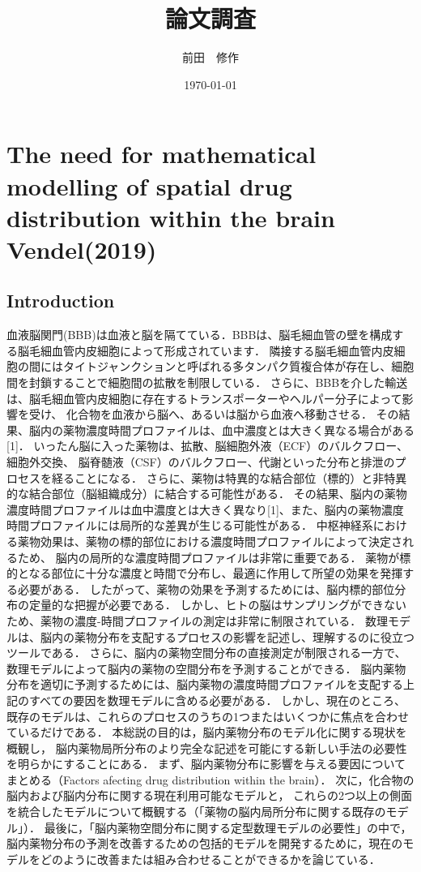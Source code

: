 \documentclass[11pt,a4paper]{jsarticle}
\title{論文調査}
\author{前田　修作}
\date{\today}
\begin{document}
\maketitle
%
%
\section{The need for mathematical modelling of spatial drug distribution within the brain Vendel(2019)}
\subsection{Introduction}
血液脳関門(BBB)は血液と脳を隔てている．BBBは、脳毛細血管の壁を構成する脳毛細血管内皮細胞によって形成されています．
隣接する脳毛細血管内皮細胞の間にはタイトジャンクションと呼ばれる多タンパク質複合体が存在し、細胞間を封鎖することで細胞間の拡散を制限している．
さらに、BBBを介した輸送は、脳毛細血管内皮細胞に存在するトランスポーターやヘルパー分子によって影響を受け、
化合物を血液から脳へ、あるいは脳から血液へ移動させる．
その結果、脳内の薬物濃度時間プロファイルは、血中濃度とは大きく異なる場合がある[1]．
いったん脳に入った薬物は、拡散、脳細胞外液（ECF）のバルクフロー、細胞外交換、
脳脊髄液（CSF）のバルクフロー、代謝といった分布と排泄のプロセスを経ることになる．
さらに、薬物は特異的な結合部位（標的）と非特異的な結合部位（脳組織成分）に結合する可能性がある．
その結果、脳内の薬物濃度時間プロファイルは血中濃度とは大きく異なり[1]、また、脳内の薬物濃度時間プロファイルには局所的な差異が生じる可能性がある．
中枢神経系における薬物効果は、薬物の標的部位における濃度時間プロファイルによって決定されるため、
脳内の局所的な濃度時間プロファイルは非常に重要である．
薬物が標的となる部位に十分な濃度と時間で分布し、最適に作用して所望の効果を発揮する必要がある．
したがって、薬物の効果を予測するためには、脳内標的部位分布の定量的な把握が必要である．
しかし、ヒトの脳はサンプリングができないため、薬物の濃度-時間プロファイルの測定は非常に制限されている．
数理モデルは、脳内の薬物分布を支配するプロセスの影響を記述し、理解するのに役立つツールである．
さらに、脳内の薬物空間分布の直接測定が制限される一方で、数理モデルによって脳内の薬物の空間分布を予測することができる．
脳内薬物分布を適切に予測するためには、脳内薬物の濃度時間プロファイルを支配する上記のすべての要因を数理モデルに含める必要がある．
しかし、現在のところ、既存のモデルは、これらのプロセスのうちの1つまたはいくつかに焦点を合わせているだけである．
本総説の目的は，脳内薬物分布のモデル化に関する現状を概観し，
脳内薬物局所分布のより完全な記述を可能にする新しい手法の必要性を明らかにすることにある．
まず、脳内薬物分布に影響を与える要因についてまとめる（Factors afecting drug distribution within the brain）．
次に，化合物の脳内および脳内分布に関する現在利用可能なモデルと，
これらの2つ以上の側面を統合したモデルについて概観する（「薬物の脳内局所分布に関する既存のモデル」）．
最後に，「脳内薬物空間分布に関する定型数理モデルの必要性」の中で，
脳内薬物分布の予測を改善するための包括的モデルを開発するために，現在のモデルをどのように改善または組み合わせることができるかを論じている．
\end{document}
